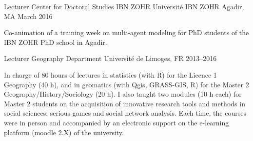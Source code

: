 \begin{cventries}
\cventry
  {Lecturer} %
  {Center for Doctoral Studies IBN ZOHR} %
  {Université IBN ZOHR Agadir, MA} %
  {March 2016} %
  {
    \begin{cvitems} %
      Co-animation of a training week on multi-agent modeling for PhD students of the IBN ZOHR PhD school in Agadir.
    \end{cvitems}
  }


\cventry
  {Lecturer} %
  {Geography Department} %
  {Université de Limoges, FR} %
  {2013--2016} %
  {
    \begin{cvitems} %
    In charge of 80 hours of lectures in statistics (with R) for the Licence 1 Geography (40 h), and in geomatics (with Qgis, GRASS-GIS, R) for the Master 2 Geography/History/Sociology (20 h). I also taught two modules (10 h each) for Master 2 students on the acquisition of innovative research tools and methods in social sciences: serious games and social network analysis. Each time, the courses were in person and accompanied by an electronic support on the e-learning platform (moodle 2.X) of the university.
    \end{cvitems}
  }


\end{cventries}
